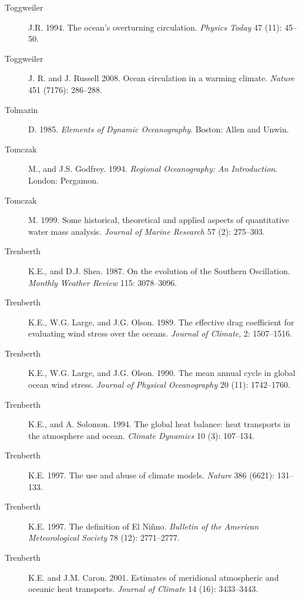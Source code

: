 \begin{description}
\item [Toggweiler]J.R. 1994. The ocean's overturning
  circulation. \textit{Physics Today} 47 (11): 45--50.

\item [Toggweiler]J. R. and J. Russell 2008. Ocean circulation in a
  warming climate. \textit{Nature} 451 (7176): 286--288.
	
\item [Tolmazin]D. 1985. \textit{Elements of Dynamic
  Oceanography}. Boston: Allen and Unwin.

\item [Tomczak]M., and J.S. Godfrey. 1994. \textit{Regional
  Oceanography: An Introduction}. London: Pergamon.

\item [Tomczak]M. 1999. Some historical, theoretical and applied
  aspects of quantitative water mass analysis. \textit{Journal of
    Marine Research} 57 (2): 275--303.

\item [Trenberth]K.E., and D.J. Shea. 1987. On the evolution of the
  Southern Oscillation. \textit{Monthly Weather Review} 115:
  3078--3096.

\item [Trenberth]K.E., W.G. Large, and J.G. Olson. 1989. The effective
  drag coefficient for evaluating wind stress over the
  oceans. \textit{Journal of Climate}, 2: 1507--1516.

\item [Trenberth]K.E., W.G. Large, and J.G. Olson. 1990. The mean
  annual cycle in global ocean wind stress. \textit{Journal of
    Physical Oceanography} 20 (11): 1742--1760.

\item [Trenberth]K.E., and A. Solomon. 1994. The global heat balance:
  heat transports in the atmosphere and ocean. \textit{Climate
    Dynamics} 10 (3): 107--134.

\item [Trenberth]K.E. 1997. The use and abuse of climate
  models. \textit{Nature} 386 (6621): 131--133.

\item [Trenberth]K.E. 1997. The definition of El
  Ni\~{n}no. \textit{Bulletin of the American Meteorological Society}
  78 (12): 2771--2777.

\item [Trenberth]K.E. and J.M. Caron. 2001. Estimates of meridional
  atmospheric and oceanic heat transports. \textit{Journal of Climate}
  14 (16): 3433--3443.


\end{description}
